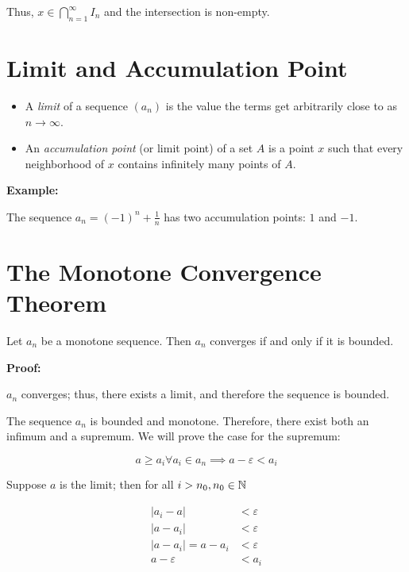 Thus, \(x \in \bigcap_{n = 1}^{\infty} I_n\) and the intersection is non-empty.

\QED

\section{Limit and Accumulation Point}

\begin{itemize}

	\item A \emph{limit} of a sequence \((a_n)\) is the value the terms get arbitrarily close to as
	      \(n \to \infty\).

	\item An \emph{accumulation point} (or limit point) of a set \(A\) is a point \(x\) such that every
	      neighborhood of \(x\) contains infinitely many points of \(A\).

\end{itemize}

\textbf{Example:}

The sequence \(a_n = {(-1)}^n + \frac{1}{n}\) has two accumulation points: \(1\) and \(-1\).

\section{The Monotone Convergence Theorem}

Let \(a_n\) be a monotone sequence. Then \(a_n\) converges if and only if it is bounded.

\textbf{Proof:}

\(a_n\) converges; thus, there exists a limit, and therefore the sequence is bounded.

The sequence \(a_n\) is bounded and monotone. Therefore, there exist both an infimum and a supremum. We will prove the case for the supremum:

\[
	a \ge a_i \forall a_i \in a_n \implies a - \varepsilon < a_i
\]

Suppose \(a\) is the limit; then for all \(i > n_0, n_0 \in \mathbb{N}\)

\begin{align*}
	|a_i - a|           & < \varepsilon \\
	|a - a_i|           & < \varepsilon \\
	|a - a_i| = a - a_i & < \varepsilon \\
	a  - \varepsilon    & < a_i
\end{align*}

